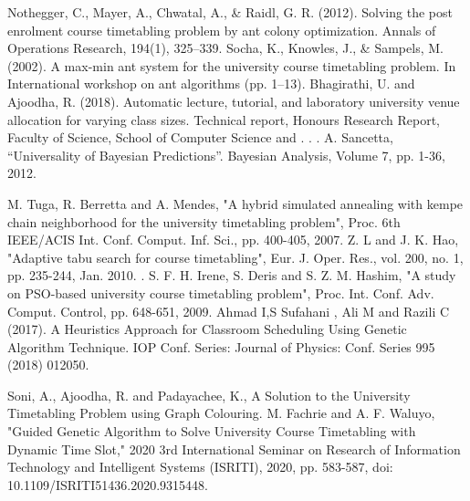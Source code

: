 \documentclass[conference]{IEEEtran}
\begin{document}
\begin{thebibliography}{00}
 Nothegger, C., Mayer, A., Chwatal, A., \& Raidl, G. R. (2012). Solving the post enrolment course timetabling problem by ant colony optimization. Annals of Operations Research, 194(1), 325–339.
 Socha, K., Knowles, J., \& Sampels, M. (2002). A max-min ant system for the university course timetabling problem. In International workshop on ant algorithms (pp. 1–13).
 Bhagirathi, U. and Ajoodha, R. (2018). Automatic lecture, tutorial, and laboratory university venue allocation for varying
class sizes. Technical report, Honours Research Report, Faculty of Science, School of Computer Science and . . . 
 A. Sancetta, “Universality of Bayesian Predictions”. Bayesian Analysis, Volume 7, pp. 1-36, 2012.

  M. Tuga, R. Berretta and A. Mendes, "A hybrid simulated annealing with kempe chain neighborhood for the university timetabling problem", Proc. 6th IEEE/ACIS Int. Conf. Comput. Inf. Sci., pp. 400-405, 2007.
 Z. L and J. K. Hao, "Adaptive tabu search for course timetabling", Eur. J. Oper. Res., vol. 200, no. 1, pp. 235-244, Jan. 2010.
 . S. F. H. Irene, S. Deris and S. Z. M. Hashim, "A study on PSO-based university course timetabling problem", Proc. Int. Conf. Adv. Comput. Control, pp. 648-651, 2009. 
 Ahmad I,S Sufahani , Ali M and Razili C (2017). A Heuristics Approach for Classroom Scheduling Using Genetic Algorithm Technique. IOP Conf. Series: Journal of Physics: Conf. Series 995 (2018) 012050.

 Soni, A., Ajoodha, R. and Padayachee, K., A Solution to the University Timetabling Problem using Graph Colouring.
 M. Fachrie and A. F. Waluyo, "Guided Genetic Algorithm to Solve University Course Timetabling with Dynamic Time Slot," 2020 3rd International Seminar on Research of Information Technology and Intelligent Systems (ISRITI), 2020, pp. 583-587, doi: 10.1109/ISRITI51436.2020.9315448.
\end{thebibliography}
\end{document}
